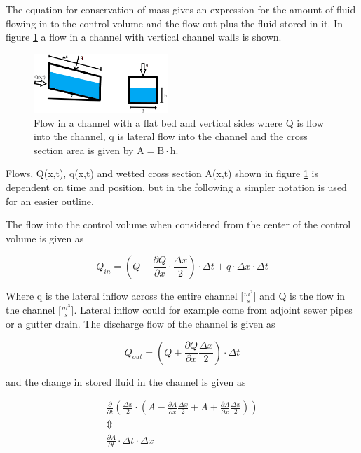 The equation for conservation of mass gives an expression for the amount of fluid flowing in to the control volume and the flow out plus the fluid stored in it.
In figure \ref{fig:firkant_kloak} a flow in a channel with vertical channel walls is shown.

\begin{figure}[H]
\centering
\includegraphics[width=0.45\textwidth]{report/modeling/pictures/firkant_kloak.png}
\caption{Flow in a channel with a flat bed and vertical sides where Q is flow into the channel, q is lateral flow into the channel and the cross section area is given by $\text{A} = \text{B} \cdot \text{h}$. }
\label{fig:firkant_kloak}
\end{figure}

Flows, Q(x,t), q(x,t) and wetted cross section A(x,t) shown in figure \ref{fig:firkant_kloak} is dependent on time and position, but in the following a simpler notation is used for an easier outline. 

The flow into the control volume when considered from the center of the control volume is given as

\begin{equation}
Q_{in} =	\left(Q - \frac{\partial Q}{\partial x}\cdot \frac{\Delta x}{2}\right) \cdot \Delta t + q \cdot \Delta x \cdot \Delta t
\label{flowin_saintbernard}
\end{equation}

Where q is the lateral inflow across the entire channel [$\frac{m^2}{s}$] and Q is the flow in the channel [$\frac{m^3}{s}$]. Lateral inflow could for example come from adjoint sewer pipes or a gutter drain.
The discharge flow of the channel is given as

\begin{equation}
Q_{out} =\left(Q + \frac{\partial Q}{ \partial x} \frac{\Delta x}{2} \right) \cdot \Delta t 
\label{flowout_saintbernard}
\end{equation}

and the change in stored fluid in the channel is given as

\begin{equation}
\begin{array}{l}
\frac{\partial}{\partial t} \left(\frac{\Delta x}{2} \cdot \left(A- \frac{\partial A}{\partial x} \frac{\Delta x}{2} +A + \frac{\partial A}{\partial x} \frac{\Delta x}{2}	\right) \right) \\
\Updownarrow \\
\frac{\partial A}{\partial t}\cdot \Delta t \cdot \Delta x	
\label{stored_saintbernard}
\end{array}
\end{equation}

